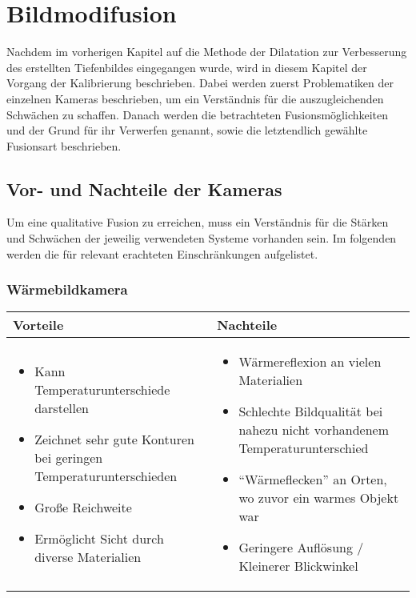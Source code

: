 
\chapter{Bildmodifusion}
\label{chap:fusion}

Nachdem im vorherigen Kapitel auf die Methode der Dilatation zur Verbesserung des erstellten Tiefenbildes eingegangen wurde, wird in diesem Kapitel der Vorgang der Kalibrierung beschrieben.
Dabei werden zuerst Problematiken der einzelnen Kameras beschrieben, um ein Verständnis für die auszugleichenden Schwächen zu schaffen.
Danach werden die betrachteten Fusionsmöglichkeiten und der Grund für ihr Verwerfen genannt, sowie die letztendlich gewählte Fusionsart beschrieben.

\section{Vor- und Nachteile der Kameras}
Um eine qualitative Fusion zu erreichen, muss ein Verständnis für die Stärken und Schwächen der jeweilig verwendeten Systeme vorhanden sein.
Im folgenden werden die für relevant erachteten Einschränkungen aufgelistet.

\subsection{Wärmebildkamera}
\begin{center}
	\begin{tabular}{| p{7.5cm} | p{7.5cm} |}
		\hline
		Vorteile & Nachteile \\ \hline
		
		\begin{itemize}
			\item Kann Temperaturunterschiede darstellen
			\item Zeichnet sehr gute Konturen bei geringen Temperaturunterschieden
			\item Große Reichweite
			\item Ermöglicht Sicht durch diverse Materialien
		\end{itemize} & \begin{itemize}
			\item Wärmereflexion an vielen Materialien
			\item Schlechte Bildqualität bei nahezu nicht vorhandenem Temperaturunterschied
			\item \enquote{Wärmeflecken} an Orten, wo zuvor ein warmes Objekt war
			\item Geringere Auflösung / Kleinerer Blickwinkel
		\end{itemize} \\ 
		\hline
	\end{tabular}
\end{center}

